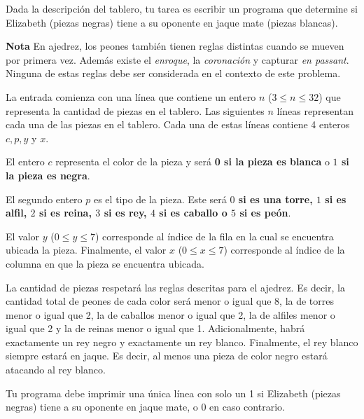 \documentclass{oci}
\begin{document}
\begin{problemDescription}
\begin{center}
\scalebox{1}{\chessboard[setfen=7K/6q1/6k1/8/8/8/8/8]}
\end{center}

Dada la descripción del tablero, tu tarea es escribir un programa que determine si Elizabeth
(piezas negras) tiene a su oponente en jaque mate (piezas blancas).

{\bf Nota}\hspace{0.5em} En ajedrez, los peones también tienen reglas distintas cuando se mueven
por primera vez.
Además existe el \emph{enroque}, la \emph{coronación} y
capturar \emph{en passant}.
Ninguna de estas reglas debe ser considerada en el contexto de este problema.

\end{problemDescription}

\begin{inputDescription}
La entrada comienza con una línea que contiene un entero $n$ ($ 3 \leq n
    \leq 32$) que representa la cantidad de piezas en el tablero.
Las siguientes $n$ líneas representan cada una de las piezas en el tablero.
Cada una de estas líneas contiene 4 enteros $c, p, y$ y $x$.

El entero $c$ representa el color de la pieza y será {\bf 0 si la pieza es blanca} o
{\bf $1$ si la pieza es negra}.

El segundo entero $p$ es el tipo de la pieza.
Este será {\bf $0$ si es una torre, $1$ si es alfil, $2$ si es reina, $3$ si es rey, $4$
si es caballo o $5$ si es peón}.

El valor $y$ ($0\leq y \leq 7$) corresponde al índice de la fila en la cual se encuentra
ubicada la pieza.
Finalmente, el valor $x$ ($0\leq x \leq 7$) corresponde al índice de la columna en que
la pieza se encuentra ubicada.

La cantidad de piezas respetará las reglas descritas para el ajedrez.
Es decir, la cantidad total de peones de cada color será menor o igual que 8, la de torres
menor o igual que 2, la de caballos menor o igual que 2, la de alfiles menor o igual que 2 y la
de reinas menor o igual que 1.
Adicionalmente, habrá exactamente un rey negro y exactamente un rey blanco.
Finalmente, el rey blanco siempre estará en jaque.
Es decir, al menos una pieza de color negro estará atacando al rey blanco.
\end{inputDescription}

\begin{outputDescription}
Tu programa debe imprimir una única línea con solo un 1 si
Elizabeth (piezas negras) tiene a su oponente en jaque mate, o 0 en caso contrario.
\end{outputDescription}
\end{document}
